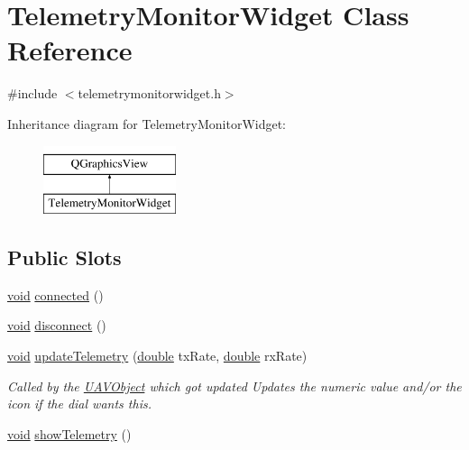 \hypertarget{class_telemetry_monitor_widget}{\section{Telemetry\-Monitor\-Widget Class Reference}
\label{class_telemetry_monitor_widget}
}


{\ttfamily \#include $<$telemetrymonitorwidget.\-h$>$}

Inheritance diagram for Telemetry\-Monitor\-Widget\-:\begin{figure}[H]
\begin{center}
\leavevmode
\includegraphics[height=2.000000cm]{class_telemetry_monitor_widget}
\end{center}
\end{figure}
\subsection*{Public Slots}
\begin{DoxyCompactItemize}
\item 
\hyperlink{group___u_a_v_objects_plugin_ga444cf2ff3f0ecbe028adce838d373f5c}{void} \hyperlink{group___core_plugin_gaa179b8e4f3d5521f7015fe7a0c2a72cd}{connected} ()
\item 
\hyperlink{group___u_a_v_objects_plugin_ga444cf2ff3f0ecbe028adce838d373f5c}{void} \hyperlink{group___core_plugin_ga94648c5dfd178bef04f3050534c2ab8d}{disconnect} ()
\item 
\hyperlink{group___u_a_v_objects_plugin_ga444cf2ff3f0ecbe028adce838d373f5c}{void} \hyperlink{group___core_plugin_ga1a8b99a026baf3050eacb392090bbc56}{update\-Telemetry} (\hyperlink{_super_l_u_support_8h_a8956b2b9f49bf918deed98379d159ca7}{double} tx\-Rate, \hyperlink{_super_l_u_support_8h_a8956b2b9f49bf918deed98379d159ca7}{double} rx\-Rate)
\begin{DoxyCompactList}\small\item\em Called by the \hyperlink{class_u_a_v_object}{U\-A\-V\-Object} which got updated Updates the numeric value and/or the icon if the dial wants this. \end{DoxyCompactList}\item 
\hyperlink{group___u_a_v_objects_plugin_ga444cf2ff3f0ecbe028adce838d373f5c}{void} \hyperlink{group___core_plugin_ga48e3859826fc4309c7d5939ef80d1ca8}{show\-Telemetry} ()
\end{DoxyCompactItemize}
